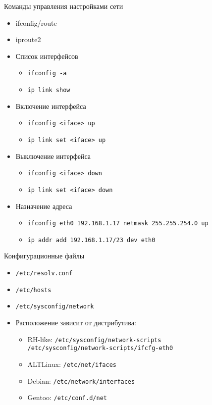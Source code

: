 \begin{frame}{Команды управления настройками сети}
	\begin{itemize}
	  \item ifconfig/route
	  \item iproute2
	\end{itemize}

	\begin{itemize}
		\item Список интерфейсов
			\begin{itemize}
				\item {\tt ifconfig -a}
				\item {\tt ip link show}
			\end{itemize}
		\item Включение интерфейса 
			\begin{itemize}
				\item {\tt ifconfig <iface> up}
				\item {\tt ip link set <iface> up}
			\end{itemize}
	  \item Выключение интерфейса
			\begin{itemize}
				\item {\tt ifconfig <iface> down}
				\item {\tt ip link set <iface> down}
			\end{itemize}
	  \item Назначение адреса
			\begin{itemize}
				\item {\tt ifconfig eth0 192.168.1.17 netmask 255.255.254.0 up}
				\item {\tt ip addr add 192.168.1.17/23 dev eth0}
			\end{itemize}
	\end{itemize}
\end{frame}

\begin{frame}{Конфигурационные файлы}
  \begin{itemize}
    \item {\tt /etc/resolv.conf}
    \item {\tt /etc/hosts}
	\item {\tt /etc/sysconfig/network}
    \item Расположение зависит от дистрибутива:
		\begin{itemize}
			\item RH-like: {\tt /etc/sysconfig/network-scripts}\\
				{\tt /etc/sysconfig/network-scripts/ifcfg-eth0}
			\item ALTLinux: {\tt /etc/net/ifaces}
			\item Debian: {\tt /etc/network/interfaces}
			\item Gentoo: {\tt /etc/conf.d/net}
		\end{itemize}
  \end{itemize}
\end{frame}

